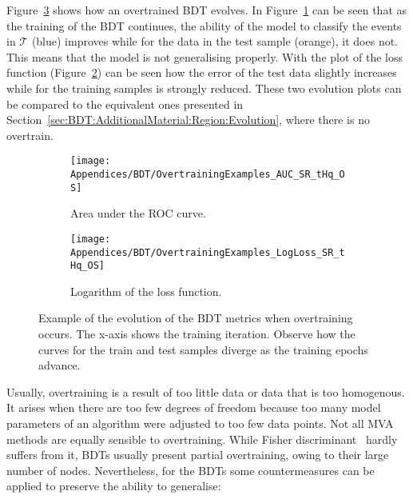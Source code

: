 Figure~\ref{fig:Appendix:BDT:Overtrain} shows how an overtrained BDT evolves. 
In Figure~\ref{fig:Appendix:BDT:Overtrain:AUC} can be seen that as the training of the
BDT continues, the ability of the model to classify the events in $\mathcal{T}$ (blue)
improves while for the data in the test sample (orange), it does not. This means that
the model is not generalising properly. 
With the plot of the loss function (Figure~\ref{fig:Appendix:BDT:Overtrain:LogLoss})
can be seen how the error of the test data slightly increases while for the training
samples is strongly reduced. These two evolution plots can be compared to
the equivalent ones presented in Section~\ref{sec:BDT:AdditionalMaterial:Region:Evolution},
where there is no overtrain.


\begin{figure}[h]
\centering
\begin{subfigure}{.475\textwidth}
  \centering
  \texttt{[image: Appendices/BDT/OvertrainingExamples\_AUC\_SR\_tHq\_OS]}
  \caption{Area under the ROC curve.}
  \label{fig:Appendix:BDT:Overtrain:AUC}
\end{subfigure}%
\begin{subfigure}{.475\textwidth}
  \centering
  \texttt{[image: Appendices/BDT/OvertrainingExamples\_LogLoss\_SR\_tHq\_OS]}
  \caption{Logarithm of the loss function.}
  \label{fig:Appendix:BDT:Overtrain:LogLoss}
\end{subfigure}
\caption{Example of the evolution of the BDT metrics when overtraining occurs. The x-axis shows the training iteration. Observe how the curves for the train and test samples diverge as the training epochs advance.}
\label{fig:Appendix:BDT:Overtrain}
\end{figure}



Usually, overtraining is a result of too little data or data that is too homogenous.
It arises when there are too few degrees of freedom because too many model parameters of an algorithm
were adjusted to too few data points.  Not all MVA methods are equally sensible to overtraining.  While Fisher 
discriminant~\cite{fisher36lda} hardly suffers from it, BDTs usually present partial overtraining, owing to their large number of 
nodes. Nevertheless, for the BDTs some countermeasures can be applied to preserve the ability to generalise:

